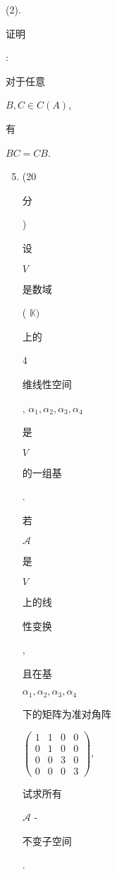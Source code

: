 \documentclass[10pt]{article}
\begin{document}
(2). \begin{CJK}{UTF8}{mj}证明\end{CJK}: \begin{CJK}{UTF8}{mj}对于任意\end{CJK} $B, C \in C(A)$, \begin{CJK}{UTF8}{mj}有\end{CJK} $B C=C B$.

\begin{enumerate}
  \setcounter{enumi}{4}
  \item (20 \begin{CJK}{UTF8}{mj}分\end{CJK}) \begin{CJK}{UTF8}{mj}设\end{CJK} $V$ \begin{CJK}{UTF8}{mj}是数域\end{CJK} ( $\mathbb{K})$ \begin{CJK}{UTF8}{mj}上的\end{CJK} 4 \begin{CJK}{UTF8}{mj}维线性空间\end{CJK}, $\alpha_{1}, \alpha_{2}, \alpha_{3}, \alpha_{4}$ \begin{CJK}{UTF8}{mj}是\end{CJK} $V$ \begin{CJK}{UTF8}{mj}的一组基\end{CJK}. \begin{CJK}{UTF8}{mj}若\end{CJK} $\mathscr{A}$ \begin{CJK}{UTF8}{mj}是\end{CJK} $V$ \begin{CJK}{UTF8}{mj}上的线\end{CJK} \begin{CJK}{UTF8}{mj}性变换\end{CJK}, \begin{CJK}{UTF8}{mj}且在基\end{CJK} $\alpha_{1}, \alpha_{2}, \alpha_{3}, \alpha_{4}$ \begin{CJK}{UTF8}{mj}下的矩阵为准对角阵\end{CJK} $\left(\begin{array}{cccc}1 & 1 & 0 & 0 \\ 0 & 1 & 0 & 0 \\ 0 & 0 & 3 & 0 \\ 0 & 0 & 0 & 3\end{array}\right)$, \begin{CJK}{UTF8}{mj}试求所有\end{CJK} $\mathscr{A}$ - \begin{CJK}{UTF8}{mj}不变子空间\end{CJK}.


\end{enumerate}
\end{document}
